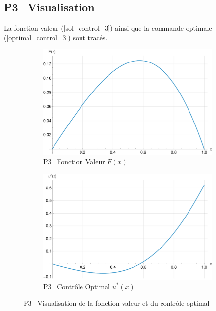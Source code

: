 \subsection{P3 \textemdash~Visualisation}
La fonction valeur (\ref{sol_control_3}) ainsi que la commande optimale (\ref{optimal_control_3}) sont tracés.
\begin{figure}[htb]
    \centering
    \begin{subfigure}{0.49\linewidth}
        \includegraphics[width=\linewidth]{img/validation/P3/p3_value.pdf}
        \caption{P3 \textemdash~Fonction Valeur $F(x)$}\label{fig:ValueVisualisation3}
    \end{subfigure}
    \hfill
    \begin{subfigure}{0.49\linewidth}
        \includegraphics[width=\linewidth]{img/validation/P3/p3_control.pdf}
        \caption{P3 \textemdash~Contrôle Optimal $u^*(x)$}\label{fig:ControlVisualisation3}
    \end{subfigure}
    \caption{P3 \textemdash~Visualisation de la fonction valeur et du contrôle optimal}\label{fig:ValueControlComparison3}
\end{figure}

